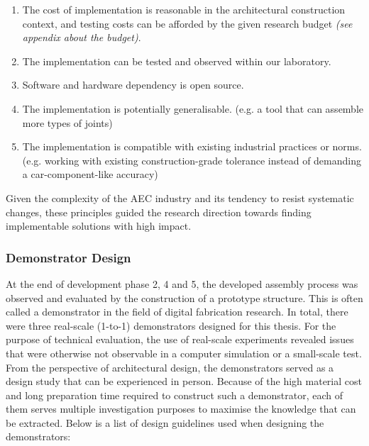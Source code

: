 \documentclass[11pt]{book}
\begin{document}
\begin{enumerate}
	\item The cost of implementation is reasonable in the architectural construction context, and testing costs can be afforded by the given research budget \textit{(see appendix about the budget)}.

	\item The implementation can be tested and observed within our laboratory.

	\item Software and hardware dependency is open source.

	\item The implementation is potentially generalisable. (e.g. a tool that can assemble more types of joints)

	\item The implementation is compatible with existing industrial practices or norms. (e.g. working with existing construction-grade tolerance instead of demanding a car-component-like accuracy) 

\end{enumerate}
Given the complexity of the AEC industry and its tendency to resist systematic changes, these principles guided the research direction towards finding implementable solutions with high impact.

\subsubsection{Demonstrator Design}

At the end of development phase 2, 4 and 5, the developed assembly process was observed and evaluated by the construction of a prototype structure. This is often called a demonstrator in the field of digital fabrication research. In total, there were three real-scale (1-to-1) demonstrators designed for this thesis. For the purpose of technical evaluation, the use of real-scale experiments revealed issues that were otherwise not observable in a computer simulation or a small-scale test. From the perspective of architectural design, the demonstrators served as a design study that can be experienced in person. Because of the high material cost and long preparation time required to construct such a demonstrator, each of them serves multiple investigation purposes to maximise the knowledge that can be extracted. Below is a list of design guidelines used when designing the demonstrators:
\end{document}
